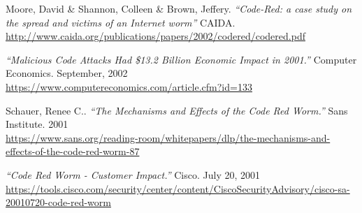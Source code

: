 \newpage
\begin{thebibliography}{99}

\begin{comment}
\bibitem{kurose} James F.~Kurose \& Keith W. Ross:
\emph{Reti di calcolatori e internet. Un approccio top-down.}
Pearson (2013)
\end{comment}

 Moore, David \& Shannon, Colleen \& Brown, Jeffery. 
\emph{``Code-Red: a case study on the spread and victims of an Internet worm''}
CAIDA.\\
\url{http://www.caida.org/publications/papers/2002/codered/codered.pdf}

\emph{``Malicious Code Attacks Had \$13.2 Billion Economic Impact in 2001.''}
Computer Economics. September, 2002\\
\url{https://www.computereconomics.com/article.cfm?id=133}

 Schauer, Renee C..
\emph{``The Mechanisms and Effects of the Code Red Worm.''}
Sans Institute. 2001\\
\url{https://www.sans.org/reading-room/whitepapers/dlp/the-mechanisms-and-effects-of-the-code-red-worm-87}

\emph{``Code Red Worm - Customer Impact.''}
Cisco. July 20, 2001\\
\url{https://tools.cisco.com/security/center/content/CiscoSecurityAdvisory/cisco-sa-20010720-code-red-worm}

\end{thebibliography}
